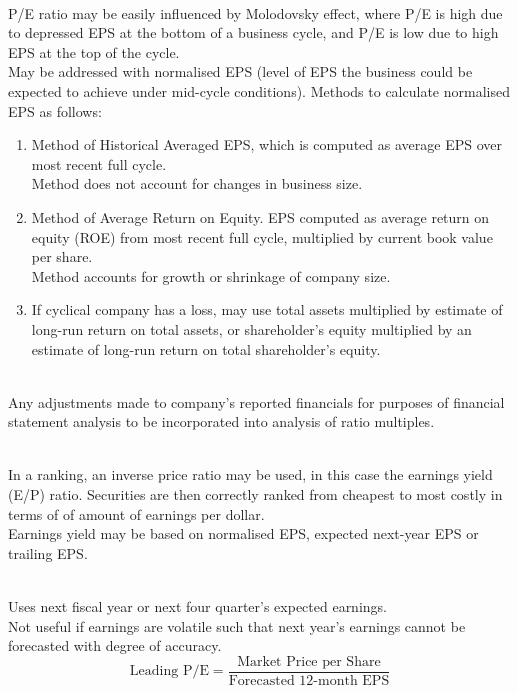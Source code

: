 \begin{remark} \\
P/E ratio may be easily influenced by Molodovsky effect, where P/E is high due to depressed EPS at the bottom of a business cycle, and P/E is low due to high EPS at the top of the cycle.\\
May be addressed with normalised EPS (level of EPS the business could be expected to achieve under mid-cycle conditions). Methods to calculate normalised EPS as follows:
\begin{enumerate}[label=\roman*.]
\setlength{\itemsep}{0pt}
\item Method of Historical Averaged EPS, which is computed as average EPS over most recent full cycle.\\
Method does not account for changes in business size.
\item Method of Average Return on Equity. EPS computed as average return on equity (ROE) from most recent full cycle, multiplied by current book value per share.\\
Method accounts for growth or shrinkage of company size.
\item If cyclical company has a loss, may use  total assets multiplied by estimate of long-run return on total assets, or shareholder's equity multiplied by an estimate of long-run return on total shareholder's equity.
\end{enumerate}
\end{remark}

\begin{remark} \\
Any adjustments made to company's reported financials for purposes of financial statement analysis to be incorporated into analysis of ratio multiples.
\end{remark}

\begin{remark} \\
In a ranking, an inverse price ratio may be used, in this case the earnings yield (E/P) ratio. Securities are then correctly ranked from cheapest to most costly in terms of of amount of earnings per dollar.\\
Earnings yield may be based on normalised EPS, expected next-year EPS or trailing EPS.
\end{remark}

\begin{definition} \\
Uses next fiscal year or next four quarter's expected earnings.\\
Not useful if earnings are volatile such that next year's earnings cannot be forecasted with degree of accuracy.
\begin{equation}
\text{Leading P/E} = \frac{\text{Market Price per Share}}{\text{Forecasted }12\text{-month EPS}} \nonumber
\end{equation}
\end{definition}

